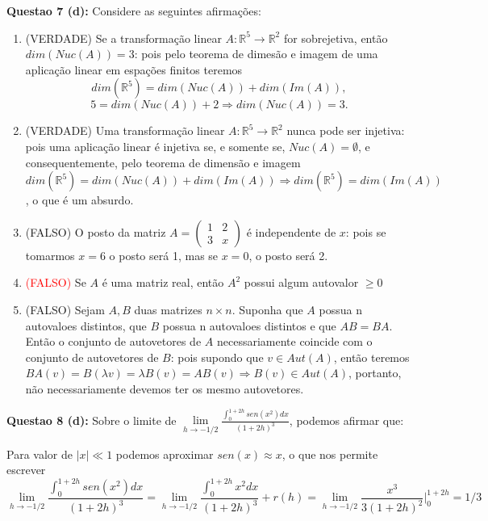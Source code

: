 \documentclass{article}
\begin{document}
\textbf{Questao 7 (d):} Considere as seguintes afirmações:
\begin{enumerate}
  \item (VERDADE) Se a transformação linear $A : \mathbb R^5 \to \mathbb R^2$
  for sobrejetiva, então $dim(Nuc(A)) = 3$: pois pelo teorema de
  dimesão e imagem de uma aplicação linear em espações finitos
  teremos 
  $$dim(\mathbb R^5 ) = dim(Nuc(A)) + dim(Im(A)),$$
  $$5 = dim(Nuc(A)) + 2 \Rightarrow dim(Nuc(A)) = 3.$$
  
  \item (VERDADE) Uma transformação linear $A : \mathbb R^5 \to \mathbb R^2$
  nunca pode ser injetiva: pois uma aplicação linear é injetiva se, e somente
  se, $Nuc(A) = \emptyset$, e consequentemente, pelo teorema de
  dimensão e imagem $dim(\mathbb R^5 ) = dim(Nuc(A)) + dim(Im(A)) \Rightarrow
  dim(\mathbb R^5 ) = dim(Im(A))$, o que é um absurdo.
  
  \item (FALSO) O posto da matriz 
$A = 
\left(
\begin{array}{cc}
      1 & 2\\
      3 & x 
\end{array}
\right)
$ é independente de $x$: pois se tomarmos $x=6$ o posto será 1, mas se $x=0$, o
posto será 2.

  \item \textcolor{red}{(FALSO)} Se $A$ é uma matriz real, então $A^2$ possui
  algum autovalor $\geq 0$
  
  \item (FALSO) Sejam $A, B$ duas matrizes $n \times n$. Suponha que $A$ possua
  n autovaloes distintos, que $B$ possua n
  autovaloes distintos e que $AB = BA$. Então o conjunto de autovetores de $A$
  necessariamente coincide com o conjunto de autovetores de $B$: pois supondo
  que $v \in Aut(A)$, então teremos $BA(v)= B(\lambda v) = \lambda B(v) = AB(v)
  \Rightarrow B(v) \in Aut(A)$, portanto, não necessariamente devemos ter os
  mesmo autovetores.

\end{enumerate}



\textbf{Questao 8 (d):} Sobre o limite de $\lim \limits_{h \to -1/2}
\frac{\int_{0}^{1+2h}  sen(x^2) dx}{(1+2h)^3} $, podemos afirmar que:

Para valor de $|x| \ll 1$ podemos aproximar $sen(x) \approx x$, o que nos
permite escrever 
$$
\lim \limits_{h \to -1/2}
\frac{\int_{0}^{1+2h}  sen(x^2) dx}{(1+2h)^3} = \lim \limits_{h \to -1/2} 
\frac{\int_{0}^{1+2h}  x^2 dx}{(1+2h)^3} + r(h) = \lim \limits_{h \to -1/2}
\frac{x^{3}}{3(1+2h)^2} \Big|^{1+2h}_{0} = 1/3
$$
\end{document}

